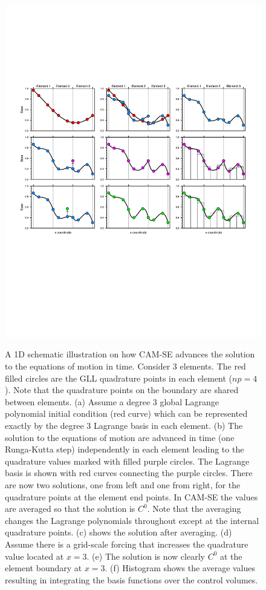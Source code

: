 \documentclass[twocol]{ametsoc}
\begin{document}
\begin{figure}[t]
\noindent\includegraphics[width=38pc,angle=0]{figs/se-schematic-arh.pdf}\\
\caption{A 1D schematic illustration on how CAM-SE advances the solution to the equations of motion in time. Consider 3 elements. The red filled circles are the GLL quadrature points in each element ($np=4$). Note that the quadrature points on the boundary are shared between elements. (a) Assume a degree 3 global Lagrange polynomial initial condition (red curve) which can be represented exactly by the degree 3 Lagrange basis in each element. (b) The solution to the equations of motion are advanced in time (one Runga-Kutta step) independently in each element leading to the quadrature values marked with filled purple circles. The Lagrange basis is shown with red curves connecting the purple circles. There are now two solutions, one from left and one from right, for the quadrature points at the element end points. In CAM-SE the values are averaged so that the solution is $C^0$. Note that the averaging changes the Lagrange polynomials throughout except at the internal quadrature points. (c) shows the solution after averaging. (d) Assume there is a grid-scale forcing that increases the quadrature value located at $x=3$. (e) The solution is now clearly $C^0$ at the element boundary at $x=3$. (f) Histogram shows the average values resulting in integrating the basis functions over the control volumes.}
\label{fig:se-schematic}
\end{figure}
\end{document}
